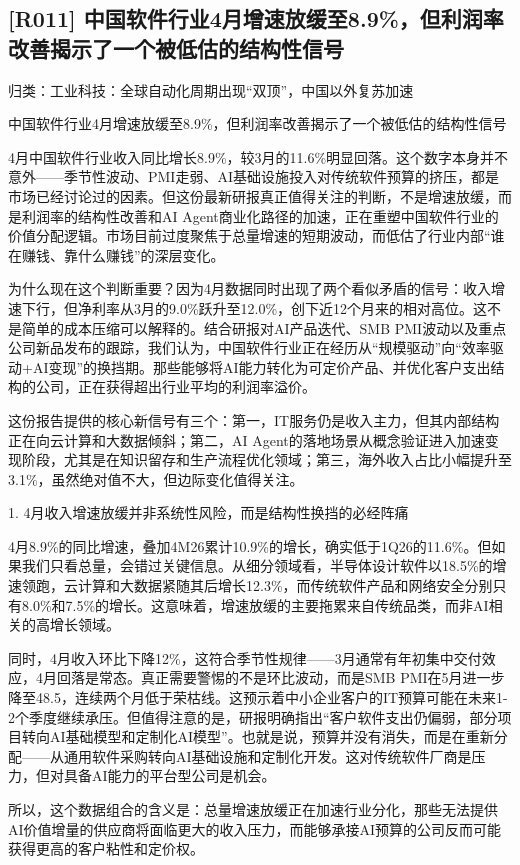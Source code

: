 \documentclass[11pt]{ctexart}
\begin{document}
\subsection{[R011] 中国软件行业4月增速放缓至8.9\%，但利润率改善揭示了一个被低估的结构性信号}
{\small\color{refgray}归类：工业科技：全球自动化周期出现“双顶”，中国以外复苏加速}

中国软件行业4月增速放缓至8.9\%，但利润率改善揭示了一个被低估的结构性信号

4月中国软件行业收入同比增长8.9\%，较3月的11.6\%明显回落。这个数字本身并不意外——季节性波动、PMI走弱、AI基础设施投入对传统软件预算的挤压，都是市场已经讨论过的因素。但这份最新研报真正值得关注的判断，不是增速放缓，而是利润率的结构性改善和AI Agent商业化路径的加速，正在重塑中国软件行业的价值分配逻辑。市场目前过度聚焦于总量增速的短期波动，而低估了行业内部“谁在赚钱、靠什么赚钱”的深层变化。

为什么现在这个判断重要？因为4月数据同时出现了两个看似矛盾的信号：收入增速下行，但净利率从3月的9.0\%跃升至12.0\%，创下近12个月来的相对高位。这不是简单的成本压缩可以解释的。结合研报对AI产品迭代、SMB PMI波动以及重点公司新品发布的跟踪，我们认为，中国软件行业正在经历从“规模驱动”向“效率驱动+AI变现”的换挡期。那些能够将AI能力转化为可定价产品、并优化客户支出结构的公司，正在获得超出行业平均的利润率溢价。

这份报告提供的核心新信号有三个：第一，IT服务仍是收入主力，但其内部结构正在向云计算和大数据倾斜；第二，AI Agent的落地场景从概念验证进入加速变现阶段，尤其是在知识留存和生产流程优化领域；第三，海外收入占比小幅提升至3.1\%，虽然绝对值不大，但边际变化值得关注。

1. 4月收入增速放缓并非系统性风险，而是结构性换挡的必经阵痛

4月8.9\%的同比增速，叠加4M26累计10.9\%的增长，确实低于1Q26的11.6\%。但如果我们只看总量，会错过关键信息。从细分领域看，半导体设计软件以18.5\%的增速领跑，云计算和大数据紧随其后增长12.3\%，而传统软件产品和网络安全分别只有8.0\%和7.5\%的增长。这意味着，增速放缓的主要拖累来自传统品类，而非AI相关的高增长领域。

同时，4月收入环比下降12\%，这符合季节性规律——3月通常有年初集中交付效应，4月回落是常态。真正需要警惕的不是环比波动，而是SMB PMI在5月进一步降至48.5，连续两个月低于荣枯线。这预示着中小企业客户的IT预算可能在未来1-2个季度继续承压。但值得注意的是，研报明确指出“客户软件支出仍偏弱，部分项目转向AI基础模型和定制化AI模型”。也就是说，预算并没有消失，而是在重新分配——从通用软件采购转向AI基础设施和定制化开发。这对传统软件厂商是压力，但对具备AI能力的平台型公司是机会。

所以，这个数据组合的含义是：总量增速放缓正在加速行业分化，那些无法提供AI价值增量的供应商将面临更大的收入压力，而能够承接AI预算的公司反而可能获得更高的客户粘性和定价权。
\end{document}
